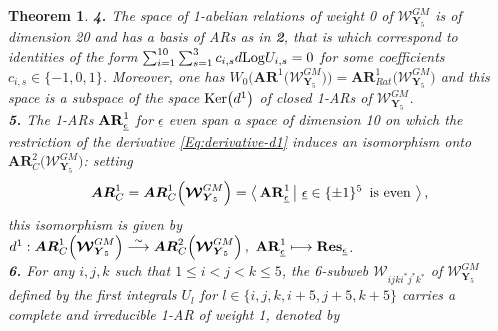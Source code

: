 \documentclass[11pt]{amsart}
\newcommand{\mk}{\medskip}
\newtheorem{thm}{Theorem}[section]
\begin{document}
\begin{thm}
{\bf 4.} The space of 1-abelian relations 
of weight 0 of  $\boldsymbol{\mathcal W}_{\boldsymbol{Y}_5}^{GM}$ is of dimension 20 and 
has a basis of ARs as in {\bf 2},  that is which correspond to identities of the form $\sum_{i=1}^{10}\sum_{s=1}^3 c_{i,s} d {\rm Log}U_{i,s}=0$ for some coefficients $c_{i,s}\in \{-1,0,1\}$.    
 Moreover, one has 
 $W_0\Big(\boldsymbol{AR}^1\big( \boldsymbol{\mathcal W}_{\boldsymbol{Y}_5}^{GM}\big)\Big)=
 \boldsymbol{AR}^1_{Rat}\big( \boldsymbol{\mathcal W}_{\boldsymbol{Y}_5}^{GM}\big)$ and this space is a subspace of the space ${\rm Ker}\big(d^1\big)$ of closed 1-ARs of $ \boldsymbol{\mathcal W}_{\boldsymbol{Y}_5}^{GM}$. 
\mk \\
{\bf 5.}  The 1-ARs ${\bf AR}_{\underline{\epsilon}}^1$ for ${\underline{\epsilon}}$ even span a space of dimension 10 
on which the restriction of the derivative \eqref{Eq:derivative-d1}  induces an isomorphism onto $\boldsymbol{AR}^2_C\Big( \boldsymbol{\mathcal W}_{\boldsymbol{Y}_5}^{GM}\Big)$: setting 
\begin{equation}
\label{Eq:AR1-C}
\boldsymbol{AR}^1_C=\boldsymbol{AR}^1_C\Big( \boldsymbol{\mathcal W}_{\boldsymbol{Y}_5}^{GM}\Big)
=\big\langle \,{\bf AR}^1_{\underline{\epsilon}} \, \big\lvert \, \,
\underline{\epsilon}\in \{\pm1\}^5 \, \mbox{ is even} \,
\, \big\rangle \, ,
\end{equation} 
this isomorphism is given by
$d^1: \boldsymbol{AR}^1_C\Big( \boldsymbol{\mathcal W}_{\boldsymbol{Y}_5}^{GM}\Big)
 \stackrel{\sim }{\longrightarrow}
\boldsymbol{AR}^2_C\Big( \boldsymbol{\mathcal W}_{\boldsymbol{Y}_5}^{GM}\Big)\, , \, \, 
{\bf AR}_{\underline{\epsilon}}^1  \longmapsto {\bf Res}_{\underline{\epsilon}}$.
\mk \\
{\bf 6.} For any $i,j,k$ such that $1\leq i<j<k\leq 5$, the 6-subweb $\boldsymbol{\mathcal W}_{ijki^*j^*k^*}$ of $\boldsymbol{\mathcal W}_{\boldsymbol{Y}_5}^{GM}$ defined by the first integrals $U_l$ for $l\in \{i,j,k,i+5,j+5,k+5\}$ carries a complete and irreducible 1-AR of weight 1, denoted by 

\end{thm}
\end{document}
